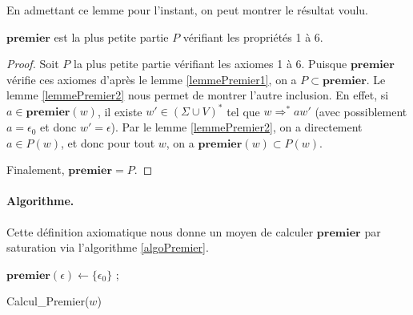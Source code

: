 En admettant ce lemme pour l'instant, on peut montrer le résultat voulu.
\begin{theorem}
$\mathbf{premier}$ est la plus petite partie $P$ vérifiant les propriétés 1 à 6.
\end{theorem}

\begin{proof}
Soit $P$ la plus petite partie vérifiant les axiomes 1 à 6. Puisque $\mathbf{premier}$ vérifie ces axiomes d'après le lemme \ref{lemmePremier1}, on a $P\subset \mathbf{premier}$. Le lemme \ref{lemmePremier2} nous permet de montrer l'autre inclusion. En effet, si $a\in \mathbf{premier}(w)$, il existe $w'\in (\Sigma \cup V)^*$ tel que $w\Rightarrow^*aw'$ (avec possiblement $a=\epsilon_0$ et donc $w'=\epsilon$). Par le lemme \ref{lemmePremier2}, on a directement $a\in P(w)$, et donc pour tout $w$, on a $\mathbf{premier}(w) \subset P(w)$.

Finalement, $\mathbf{premier}=P$.
\end{proof}



\paragraph{Algorithme.} Cette définition axiomatique nous donne un moyen de calculer $\mathbf{premier}$ par saturation via l'algorithme \ref{algoPremier}.\newline

\begin{algorithm}[!h]
$\mathbf{premier}(\epsilon) \leftarrow \{\epsilon_0\}$ ; \\
\caption{Calcul\_Premier($w$)}\label{algoPremier}
\end{algorithm}

